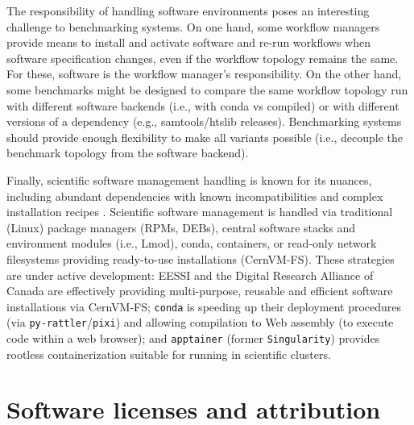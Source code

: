 \documentclass[11pt]{article}
\begin{document}
{\color{red} 
The responsibility of handling software environments poses an interesting challenge to benchmarking systems. On one hand, some workflow managers provide means to install and activate software and re-run workflows when software specification changes, even if the workflow topology remains the same. For these, software is the workflow manager's responsibility. On the other hand, some benchmarks might be designed to compare the same workflow topology run with different software backends (i.e., with conda vs compiled) or with different versions of a dependency (e.g., samtools/htslib releases). Benchmarking systems should provide enough flexibility to make all variants possible (i.e., decouple the benchmark topology from the software backend).

Finally, scientific software management handling is known for its nuances, including abundant dependencies with known incompatibilities and complex installation recipes \cite{droge2023-ax}. Scientific software management is handled via traditional (Linux) package managers (RPMs, DEBs), central software stacks and environment modules (i.e., Lmod), conda, containers, or read-only network filesystems providing ready-to-use installations (CernVM-FS). These strategies are under active development: EESSI \cite{droge2023-ax} and the Digital Research Alliance of Canada \cite{Boissonneault2019-wm} are effectively providing multi-purpose, reusable and efficient software installations via CernVM-FS; \texttt{conda} is speeding up their deployment procedures (via \texttt{py-rattler}/\texttt{pixi}) and allowing compilation to Web assembly (to execute code within a web browser); and \texttt{apptainer} (former \texttt{Singularity}) provides rootless containerization suitable for running in scientific clusters. 
}


\section*{Software licenses and attribution}
\end{document}
